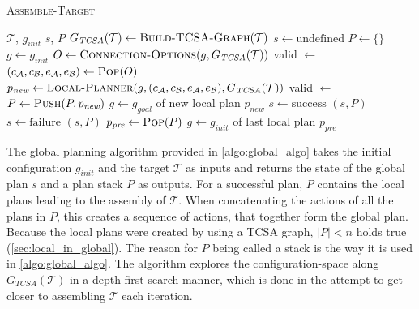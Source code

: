 \begin{algorithm}
	\caption{\scshape Assemble-Target}
	\label{algo:global_algo}
	\begin{algorithmic}[1]
		\REQUIRE $\mathcal{T}$, $g_\textit{init}$ 
		\ENSURE $s$, $P$ 
		\STATE $G_{\textit{TCSA}}(\mathcal{T}) \gets \text{\scshape Build-TCSA-Graph}(\mathcal{T})$
		\STATE $s \gets \text{undefined}$
		\STATE $P \gets \{\}$ 
		\STATE $g \gets g_\textit{init}$ 
		\LOOP
			\STATE $O \gets \text{\scshape Connection-Options}(g, G_{\textit{TCSA}}(\mathcal{T}))$
			\STATE valid $\gets$ \FALSE
				\STATE $(c_\mathcal{A}, c_\mathcal{B}, e_\mathcal{A}, e_\mathcal{B}) \gets \text{\scshape Pop}(O)$
				\STATE $p_\textit{new} \gets \text{\scshape Local-Planner}(g, (c_\mathcal{A}, c_\mathcal{B}, e_\mathcal{A}, e_\mathcal{B}), G_{\textit{TCSA}}(\mathcal{T}))$
					\STATE valid $\gets$ \TRUE
				\ENDIF
			\ENDWHILE
				\STATE $P \gets \text{\scshape Push}(P, p_\textit{new})$ 
				\STATE $g \gets g_\textit{goal}$ of new local plan $p_\textit{new}$ 
					\STATE $s \gets \text{success}$
					\RETURN $(s, P)$
				\ENDIF
			\ELSE
					\STATE $s \gets \text{failure}$
					\RETURN $(s, P)$
				\ENDIF
				\STATE $p_\textit{pre} \gets \text{\scshape Pop}(P)$ 
				\STATE $g \gets g_\textit{init}$ of last local plan $p_\textit{pre}$ 
			\ENDIF
		\ENDLOOP
	\end{algorithmic}
\end{algorithm}

The global planning algorithm provided in \autoref{algo:global_algo} takes the initial configuration $g_\textit{init}$ and the target $\mathcal{T}$ as inputs and returns the state of the global plan $s$ and a plan stack $P$ as outputs.
For a successful plan, $P$ contains the local plans leading to the assembly of $\mathcal{T}$.
When concatenating the actions of all the plans in $P$, this creates a sequence of actions, that together form the global plan.
Because the local plans were created by using a TCSA graph, $|P| < n$ holds true (\autoref{sec:local_in_global}).
The reason for $P$ being called a stack is the way it is used in \autoref{algo:global_algo}.
The algorithm explores the configuration-space along $G_{\textit{TCSA}}(\mathcal{T})$ in a depth-first-search manner, which is done in the attempt to get closer to assembling $\mathcal{T}$ each iteration.

